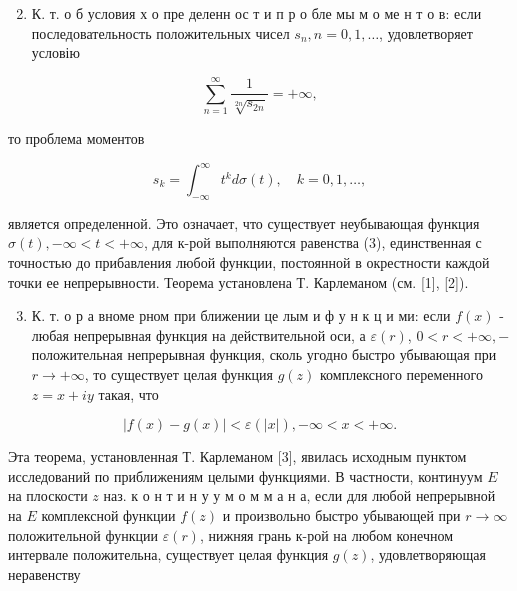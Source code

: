 \documentclass[10pt]{article}
\begin{document}
\begin{enumerate}

  \setcounter{enumi}{1}

  \item К. т. о б условия х о пре деленн ос т и п р о бле мы м о ме н т о в: если последовательность положительных чисел $s_{n}, n=0,1, \ldots$, удовлетворяет условію

\end{enumerate}



\[

\sum_{n=1}^{\infty} \frac{1}{\sqrt[2 n]{s_{2 n}}}=+\infty,

\]



то проблема моментов



\[

s_{k}=\int_{-\infty}^{\infty} t^{k} d \sigma(t), \quad k=0,1, \ldots,

\]



является определенной. Это означает, что существует неубывающая функция $\sigma(t),-\infty<t<+\infty$, для к-рой выполняются равенства (3), единственная с точностью до прибавления любой функции, постоянной в окрестности каждой точки ее непрерывности. Теорема установлена Т. Карлеманом (см. [1], [2]).



\begin{enumerate}

  \setcounter{enumi}{2}

  \item К. т. о р а вноме рном при ближении це лым и ф у н к ц и ми: если $f(x)$ - любая непрерывная функция на действительной оси, а $\varepsilon(r)$, $0<r<+\infty,-$ положительная непрерывная функция, сколь угодно быстро убывающая при $r \rightarrow+\infty$, то существует целая функция $g(z)$ комплексного переменного $z=x+i y$ такая, что

\end{enumerate}



\[

|f(x)-g(x)|<\varepsilon(|x|),-\infty<x<+\infty .

\]



Эта теорема, установленная Т. Карлеманом [3], явилась исходным пунктом исследований по приближениям целыми функциями. В частности, континуум $E$ на плоскости $z$ наз. к о н т и н у у м о м м а н а, если для любой непрерывной на $E$ комплексной функции $f(z)$ и произвольно быстро убывающей при $r \rightarrow \infty$ положительной функции $\varepsilon(r)$, нижняя грань к-рой на любом конечном интервале положительна, существует целая функция $g(z)$, удовлетворяющая неравенству
\end{document}

